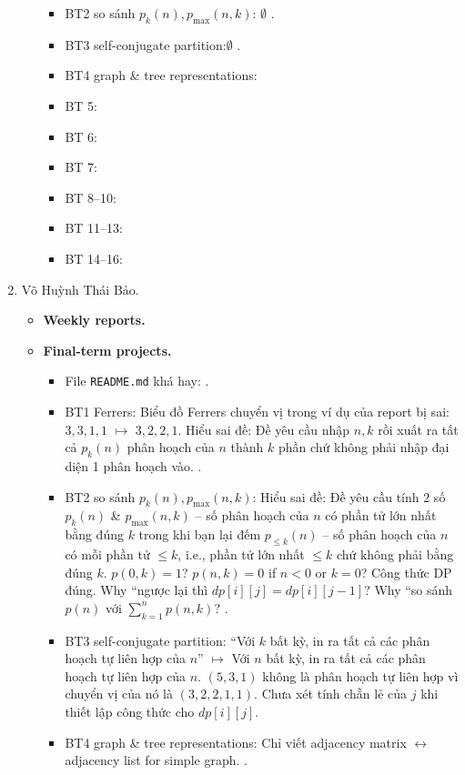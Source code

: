 \documentclass{article}
\begin{document}
\begin{enumerate}
\begin{itemize}
\begin{itemize}
            \item BT2 so sánh $p_k(n),p_{\max}(n,k)$: $\emptyset$ .
            \item BT3 self-conjugate partition:$\emptyset$ .
            \item BT4 graph \& tree representations:
            \item BT 5:
            \item BT 6:
            \item BT 7:
            \item BT 8--10:
            \item BT 11--13:
            \item BT 14--16:
        \end{itemize}
    \end{itemize}
    \item {\sc Võ Huỳnh Thái Bảo.}
    \begin{itemize}
        \item {\bf Weekly reports.}
        \item {\bf Final-term projects.}
        \begin{itemize}
            \item File {\tt README.md} khá hay: .
            \item BT1 Ferrers: Biểu đồ Ferrers chuyển vị trong ví dụ của report bị sai: \st{$3,3,1,1$} $\mapsto$ $3,2,2,1$. Hiểu sai đề: Đề yêu cầu nhập $n,k$ rồi xuất ra tất cả $p_k(n)$ phân hoạch của $n$ thành $k$ phần chứ không phải nhập đại diện 1 phân hoạch vào. .
            \item BT2 so sánh $p_k(n),p_{\max}(n,k)$:  Hiểu sai đề: Đề yêu cầu tính 2 số $p_k(n)$ \& $p_{\max}(n,k)$ -- số phân hoạch của $n$ có phần tử lớn nhất bằng đúng $k$ trong khi bạn lại đếm $p_{\le k}(n)$ -- số phân hoạch của $n$ có mỗi phần tử $\le k$, i.e., phần tử lớn nhất $\le k$ chứ không phải bằng đúng $k$. $p(0,k) = 1$? $p(n,k) = 0$ if $n < 0$ or $k = 0$? Công thức DP đúng. Why ``ngược lại thì $dp[i][j] = dp[i][j - 1]$? Why ``so sánh $p(n)$ với $\sum_{k=1}^n p(n,k)$? .
            \item BT3 self-conjugate partition: ``Với \st{$k$} bất kỳ, in ra tất cả các phân hoạch tự liên hợp của $n$'' $\mapsto$ Với $n$ bất kỳ, in ra tất cả các phân hoạch tự liên hợp của $n$. $(5,3,1)$ không là phân hoạch tự liên hợp vì chuyển vị của nó là $(3,2,2,1,1)$. Chưa xét tính chẵn lẻ của $j$ khi thiết lập công thức cho $dp[i][j]$.
            \item BT4 graph \& tree representations: Chỉ viết adjacency matrix $\leftrightarrow$ adjacency list for simple graph. .

\end{itemize}
\end{itemize}
\end{enumerate}
\end{document}
